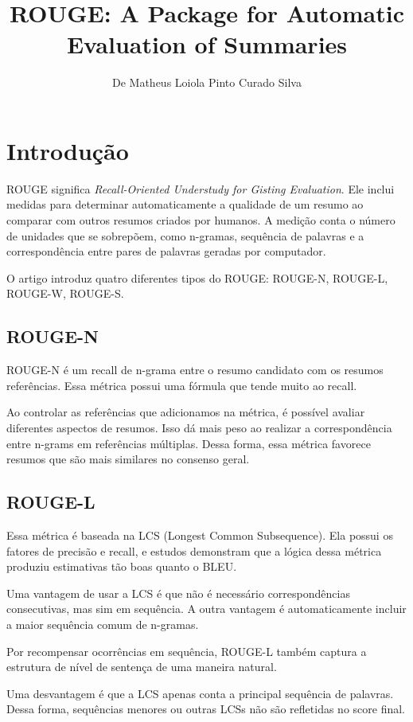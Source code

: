 \documentclass[12pt]{article}
\title{ROUGE: A Package for Automatic Evaluation of Summaries}
\author{De Matheus Loiola Pinto Curado Silva}
\date{}
\begin{document}
	
\maketitle

\section*{Introdução}

ROUGE significa \textit{Recall-Oriented Understudy for Gisting Evaluation}. Ele inclui medidas para determinar automaticamente a qualidade de um resumo ao comparar com outros resumos criados por humanos. A medição conta o número de unidades que se sobrepõem, como n-gramas, sequência de palavras e a correspondência entre pares de palavras geradas por computador.

O artigo introduz quatro diferentes tipos do ROUGE: ROUGE-N, ROUGE-L, ROUGE-W, ROUGE-S.

\subsection*{ROUGE-N}

ROUGE-N é um recall de n-grama entre o resumo candidato com os resumos referências. Essa métrica possui uma fórmula que tende muito ao recall.

Ao controlar as referências que adicionamos na métrica, é possível avaliar diferentes aspectos de resumos. Isso dá mais peso ao realizar a correspondência entre n-grams em referências múltiplas. Dessa forma, essa métrica favorece resumos que são mais similares no consenso geral.

\subsection*{ROUGE-L}

Essa métrica é baseada na LCS (Longest Common Subsequence). Ela possui os fatores de precisão e recall, e estudos demonstram que a lógica dessa métrica produziu estimativas tão boas quanto o BLEU.

Uma vantagem de usar a LCS é que não é necessário correspondências consecutivas, mas sim em sequência. A outra vantagem é automaticamente incluir a maior sequência comum de n-gramas.

Por recompensar ocorrências em sequência, ROUGE-L também captura a estrutura de nível de sentença de uma maneira natural.

Uma desvantagem é que a LCS apenas conta a principal sequência de palavras. Dessa forma, sequências menores ou outras LCSs não são refletidas no score final.
\end{document}
